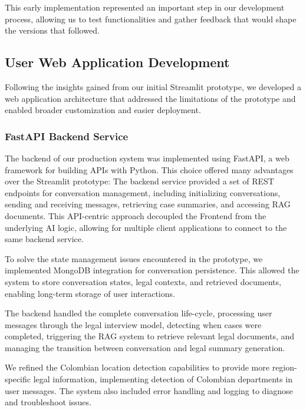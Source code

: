 This early implementation represented an important step in our development process, allowing us to test functionalities and gather 
feedback that would shape the versions that followed.

\subsection{User Web Application Development}
\label{subsec:web-application}

Following the insights gained from our initial Streamlit prototype, we developed a web application architecture that addressed the limitations of the prototype and enabled broader customization and easier deployment.


\subsubsection{FastAPI Backend Service}

The backend of our production system was implemented using FastAPI, a web framework for building APIs with Python. 
This choice offered many advantages over the Streamlit prototype:
The backend service provided a set of REST endpoints for conversation management, including initializing conversations, sending and receiving messages, 
retrieving case summaries, and accessing RAG documents. This API-centric approach decoupled the Frontend from the underlying AI logic, allowing for multiple client 
applications to connect to the same backend service.

To solve the state management issues encountered in the prototype, we implemented MongoDB integration for conversation persistence. This allowed the system to store 
conversation states, legal contexts, and retrieved documents, enabling long-term storage of user interactions.

The backend handled the complete conversation life-cycle, processing user messages through the legal interview model, 
detecting when cases were completed, triggering the RAG system to retrieve relevant legal documents, and managing the transition 
between conversation and legal summary generation.

We refined the Colombian location detection capabilities to provide more region-specific legal information, implementing detection of Colombian departments in user messages. 
The system also included error handling and logging to diagnose and troubleshoot issues.

